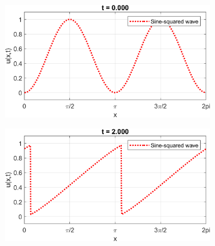 \documentclass{myproject}
\begin{document}
\begin{figure}
    \centering
    \begin{subfigure}[b]{0.40\textwidth}
       \includegraphics[width=1\linewidth]{sine-squared_wave_0.png}
       \caption{}
    \end{subfigure}\qquad
    \begin{subfigure}[b]{0.40\textwidth}
       \includegraphics[width=1\linewidth]{sine-squared_wave_2.png}
       \caption{}
    \end{subfigure}

    \vspace{\floatsep}


\end{figure}
\end{document}

